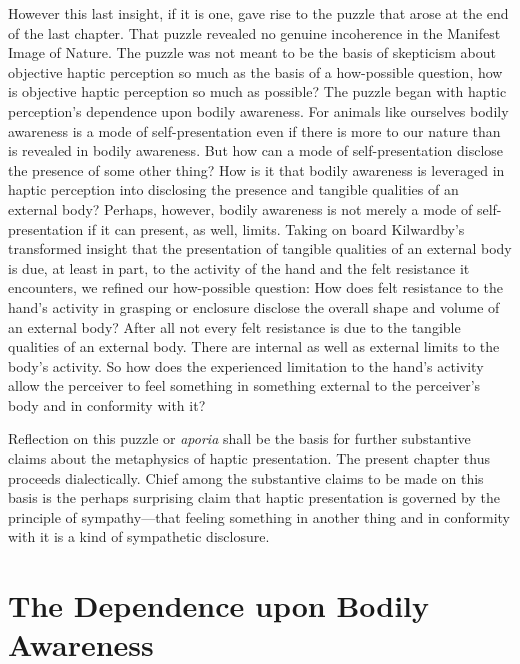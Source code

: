 However this last insight, if it is one, gave rise to the puzzle that arose at the end of the last chapter. That puzzle revealed no genuine incoherence in the Manifest Image of Nature. The puzzle was not meant to be the basis of skepticism about objective haptic perception so much as the basis of a how-possible question, how is objective haptic perception so much as possible? The puzzle began with haptic perception's dependence upon bodily awareness. For animals like ourselves bodily awareness is a mode of self-presentation even if there is more to our nature than is revealed in bodily awareness. But how can a mode of self-presentation disclose the presence of some other thing? How is it that bodily awareness is leveraged in haptic perception into disclosing the presence and tangible qualities of an external body? Perhaps, however, bodily awareness is not merely a mode of self-presentation if it can present, as well, limits. Taking on board Kilwardby's transformed insight that the presentation of tangible qualities of an external body is due, at least in part, to the activity of the hand and the felt resistance it encounters, we refined our how-possible question: How does felt resistance to the hand's activity in grasping or enclosure disclose the overall shape and volume of an external body? After all not every felt resistance is due to the tangible qualities of an external body. There are internal as well as external limits to the body's activity. So how does the experienced limitation to the hand's activity allow the perceiver to feel something in something external to the perceiver's body and in conformity with it?

Reflection on this puzzle or \emph{aporia} shall be the basis for further substantive claims about the metaphysics of haptic presentation. The present chapter thus proceeds dialectically. Chief among the substantive claims to be made on this basis is the perhaps surprising claim that haptic presentation is governed by the principle of sympathy---that feeling something in another thing and in conformity with it is a kind of sympathetic disclosure. 


\section{The Dependence upon Bodily Awareness} %
\label{sec:the_dependence_of_haptic_perception_upon_bodily_awareness}

